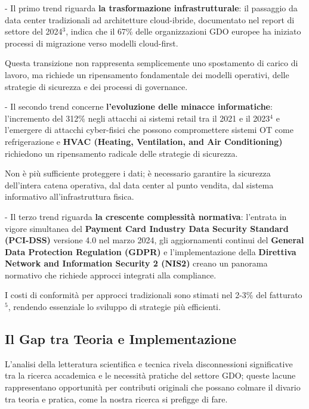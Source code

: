 \documentclass[12pt,a4paper,oneside]{book}
\numberwithin{figure}{chapter} %
\numberwithin{table}{chapter}  %
\begin{document}
- Il primo trend riguarda \textbf{la trasformazione infrastrutturale}:
il passaggio da data center tradizionali ad architetture cloud-ibride,
documentato nel report di settore del 2024$^3$, indica che il 67\% delle
organizzazioni GDO europee ha iniziato processi di migrazione verso
modelli cloud-first.

Questa transizione non rappresenta semplicemente uno spostamento di
carico di lavoro, ma richiede un ripensamento fondamentale dei modelli
operativi, delle strategie di sicurezza e dei processi di governance.

- Il secondo trend concerne \textbf{l'evoluzione delle minacce
informatiche}: l'incremento del 312\% negli attacchi ai sistemi retail
tra il 2021 e il 2023$^4$ e l'emergere di attacchi cyber-fisici che possono
compromettere sistemi OT come refrigerazione e \textbf{HVAC (Heating,
Ventilation, and Air Conditioning)} richiedono un ripensamento radicale
delle strategie di sicurezza.

Non è più sufficiente proteggere i dati; è necessario garantire la
sicurezza dell'intera catena operativa, dal data center al punto
vendita, dal sistema informativo all'infrastruttura fisica.

- Il terzo trend riguarda \textbf{la crescente complessità normativa}:
l'entrata in vigore simultanea del \textbf{Payment Card Industry Data
Security Standard (PCI-DSS)} versione 4.0 nel marzo 2024, gli
aggiornamenti continui del \textbf{General Data Protection Regulation
(GDPR)} e l'implementazione della \textbf{Direttiva Network and
Information Security 2 (NIS2)} creano un panorama normativo che richiede
approcci integrati alla compliance.

I costi di conformità per approcci tradizionali sono stimati nel 2-3\%
del fatturato$^5$, rendendo essenziale lo sviluppo di strategie più
efficienti.

\subsection{\texorpdfstring{\textbf{Il Gap tra Teoria e
Implementazione}}{1.1.3 Il Gap tra Teoria e Implementazione}}\label{il-gap-tra-teoria-e-implementazione}

L'analisi della letteratura scientifica e tecnica rivela disconnessioni
significative tra la ricerca accademica e le necessità pratiche del
settore GDO; queste lacune rappresentano opportunità per contributi
originali che possano colmare il divario tra teoria e pratica, come la nostra ricerca si prefigge di fare.
\end{document}
